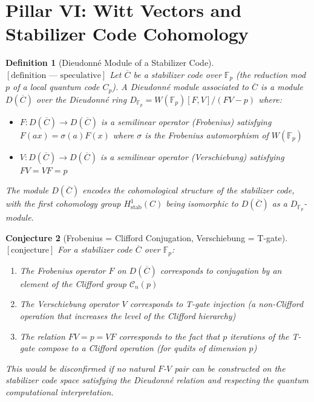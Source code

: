 \documentclass[12pt]{article}
\newtheorem{definition}{Definition}[section]
\newtheorem{conjecture}[definition]{Conjecture}
\theoremstyle{remark}
\begin{document}
\section{Pillar VI: Witt Vectors and Stabilizer Code Cohomology}

\begin{definition}[Dieudonn\'e Module of a Stabilizer Code]
$[\text{definition — speculative}]$
Let $\overline{C}$ be a stabilizer code over $\mathbb{F}_p$ (the reduction
mod $p$ of a local quantum code $C_p$). A \emph{Dieudonn\'e module}
associated to $\overline{C}$ is a module $D(\overline{C})$ over the
Dieudonn\'e ring $D_{\mathbb{F}_p} = W(\mathbb{F}_p)[F, V]/(FV - p)$
where:
\begin{itemize}
\item $F: D(\overline{C}) \to D(\overline{C})$ is a semilinear operator
  (Frobenius) satisfying $F(ax) = \sigma(a) F(x)$ where $\sigma$ is the
  Frobenius automorphism of $W(\mathbb{F}_p)$
\item $V: D(\overline{C}) \to D(\overline{C})$ is a semilinear operator
  (Verschiebung) satisfying $FV = VF = p$
\end{itemize}
The module $D(\overline{C})$ encodes the cohomological structure of the
stabilizer code, with the first cohomology group $H^1_{\text{stab}}(C)$
being isomorphic to $D(\overline{C})$ as a $D_{\mathbb{F}_p}$-module.
\end{definition}

\begin{conjecture}[Frobenius = Clifford Conjugation, Verschiebung = T-gate]
$[\text{conjecture}]$
For a stabilizer code $\overline{C}$ over $\mathbb{F}_p$:
\begin{enumerate}
\item The Frobenius operator $F$ on $D(\overline{C})$ corresponds to
  conjugation by an element of the Clifford group $\mathcal{C}_n(p)$
\item The Verschiebung operator $V$ corresponds to T-gate injection
  (a non-Clifford operation that increases the level of the Clifford
  hierarchy)
\item The relation $FV = p = VF$ corresponds to the fact that $p$
  iterations of the T-gate compose to a Clifford operation (for qudits
  of dimension $p$)
\end{enumerate}
This would be disconfirmed if no natural $F$-$V$ pair can be constructed
on the stabilizer code space satisfying the Dieudonn\'e relation and
respecting the quantum computational interpretation.
\end{conjecture}
\end{document}
